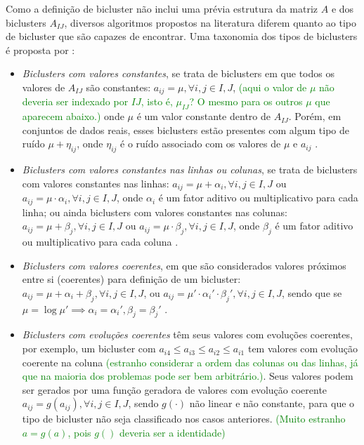 \documentclass[
    12pt,                %
    oneside,            %
    a4paper,            %
    english,            %
    brazil                %
    ]{abntex2ppgsi}
\begin{document}
Como a definição de bicluster não inclui uma prévia estrutura da matriz $A$ e dos biclusters $A_{IJ}$, diversos algoritmos propostos na literatura diferem quanto ao tipo de bicluster que são capazes de encontrar.
Uma taxonomia dos tipos de biclusters é proposta por :
 \begin{itemize}
  \item \textit{Biclusters com valores constantes}, se trata de biclusters em que todos os valores de $A_{IJ}$ são constantes: $a_{ij} = \mu, \forall i,j \in I,J$, \textcolor{green}{(aqui o valor de $\mu$ não deveria ser indexado por $IJ$, isto é, $\mu_{IJ}$? O mesmo para os outros $\mu$ que aparecem abaixo.)} onde $\mu$ é um valor constante dentro de $A_{IJ}$. Porém, em conjuntos de dados reais, esses biclusters estão presentes com algum tipo de ruído $\mu + \eta_{ij}$, onde $\eta_{ij}$ é o ruído associado com os valores de $\mu$ e $a_{ij}$ \cite{Madeira2004}.
  \item \textit{Biclusters com valores constantes nas linhas ou colunas}, se trata de biclusters com valores constantes nas linhas: $a_{ij} = \mu + \alpha_i, \forall i,j \in I,J$ ou $a_{ij} = \mu \cdot \alpha_i, \forall i,j \in I,J$, onde $\alpha_i$ é um fator aditivo ou multiplicativo para cada linha; ou ainda biclusters com valores constantes nas colunas: $a_{ij} = \mu + \beta_j, \forall i,j \in I,J$ ou $a_{ij} = \mu \cdot \beta_j, \forall i,j \in I,J$, onde $\beta_j$ é um fator aditivo ou multiplicativo para cada coluna \cite{Madeira2004}.
  \item \textit{Biclusters com valores coerentes}, em que são considerados valores próximos entre si (coerentes) para definição de um bicluster: $a_{ij} = \mu + \alpha_i + \beta_j, \forall i,j \in I,J$, ou $a_{ij} = \mu' \cdot \alpha_i' \cdot \beta_j', \forall i,j \in I,J$, sendo que se $\mu = \log \mu'\implies \alpha_i = \alpha_i', \beta_j = \beta_j'$ \cite{Madeira2004}.
  \item \textit{Biclusters com evoluções coerentes} têm seus valores com evoluções coerentes, por exemplo, um bicluster com $a_{i4} \leq a_{i3} \leq a_{i2} \leq a_{i1}$ tem valores com evolução coerente na coluna \cite{Madeira2004} \textcolor{green}{(estranho considerar a ordem das colunas ou das linhas, já que na maioria dos problemas pode ser bem arbitrário.)}. Seus valores podem ser gerados por uma função geradora de valores com evolução coerente $a_{ij} = g(a_{ij}), \forall i,j \in I,J$, sendo $g(\cdot)$ não linear e não constante, para que o tipo de bicluster não seja classificado nos casos anteriores. \textcolor{green}{(Muito estranho $a=g(a)$, pois $g()$ deveria ser a identidade)}
 \end{itemize}
\end{document}
